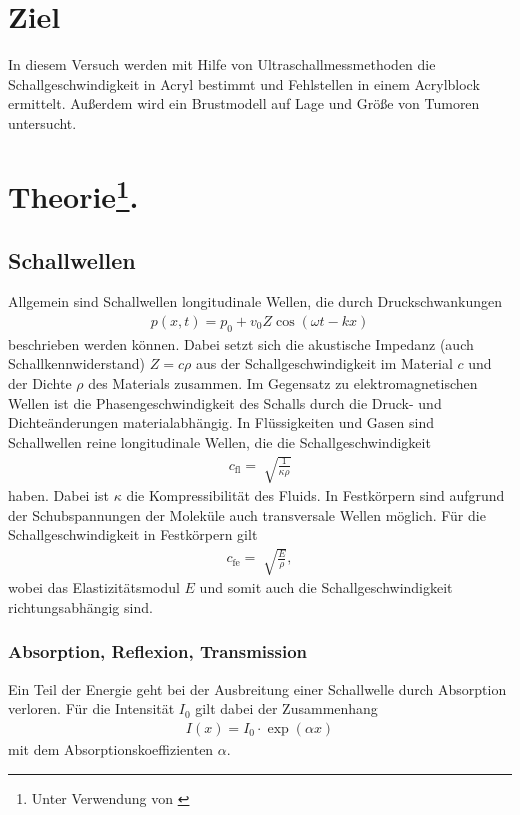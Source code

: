 \section{Ziel}
In diesem Versuch werden mit Hilfe von Ultraschallmessmethoden die Schallgeschwindigkeit in Acryl bestimmt und Fehlstellen in einem Acrylblock ermittelt.
Außerdem wird ein Brustmodell auf Lage und Größe von Tumoren untersucht. 



\section[Theorie]{Theorie\footnote[1]{Unter Verwendung von \cite[]{man:us1}}.}

\subsection{Schallwellen}
Allgemein sind Schallwellen longitudinale Wellen, die durch Druckschwankungen
\begin{align}
    p(x,t) = p_0 + v_0 Z \cos(\omega t - kx)
    \label{eq:welle}
\end{align}
beschrieben werden können.
Dabei setzt sich die akustische Impedanz (auch Schallkennwiderstand) $Z = c \rho$ aus der Schallgeschwindigkeit im Material $c$ und der Dichte $\rho$ des Materials zusammen.
Im Gegensatz zu elektromagnetischen Wellen ist die Phasengeschwindigkeit des Schalls durch die Druck- und Dichteänderungen materialabhängig.
In Flüssigkeiten und Gasen sind Schallwellen reine longitudinale Wellen, die die Schallgeschwindigkeit
\begin{align}
    c_\text{fl} = \sqrt[]{\frac{1}{\kappa \rho}}  
    \label{eq:c-fluid}
\end{align}
haben. 
Dabei ist $\kappa$ die Kompressibilität des Fluids.
In Festkörpern sind aufgrund der Schubspannungen der Moleküle auch transversale Wellen möglich.
Für die Schallgeschwindigkeit in Festkörpern gilt
\begin{align}
    c_\text{fe} = \sqrt[]{\frac{E}{\rho}},
    \label{eq:c-fest}
\end{align}
wobei das Elastizitätsmodul $E$ und somit auch die Schallgeschwindigkeit richtungsabhängig sind.



\subsubsection{Absorption, Reflexion, Transmission}
Ein Teil der Energie geht bei der Ausbreitung einer Schallwelle durch Absorption verloren.
Für die Intensität $I_0$ gilt dabei der Zusammenhang 
\begin{align}
    I(x) = I_0 \cdot \exp(\alpha x)
    \label{eq:absorption}
\end{align}
mit dem Absorptionskoeffizienten $\alpha$.

